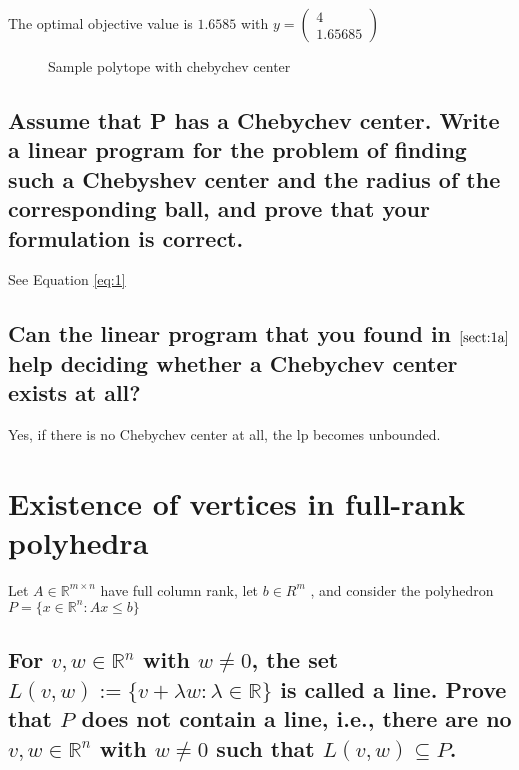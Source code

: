 \documentclass[12pt, a4]{article}
\newcommand{\lightgray}{black!30}
\newcommand{\plotDomain}{-1:10}
\newcommand{\addPlotLDownCoords}[1]{
	\addplot[mark=none, domain=\plotDomain, color=\lightgray,
	decoration={border,segment length=1mm,amplitude=1.5mm,angle=-135},
	postaction={decorate}
	] coordinates {#1};
	\addplot[mark=none, domain=\plotDomain] coordinates {#1};
}
\newcommand{\addPlotLDown}[1]{
	\addplot[mark=none, domain=\plotDomain, color=\lightgray,
	decoration={border,segment length=1mm,amplitude=1.5mm,angle=-135},
	postaction={decorate}
	] {#1};
	\addplot[mark=none, domain=\plotDomain] {#1};
}
\newcommand{\addPlotRUp}[1]{
	\addplot[mark=none, domain=\plotDomain, color=\lightgray,
	decoration={border,segment length=1mm,amplitude=1.5mm,angle=135},
	postaction={decorate}
	] {#1};
	\addplot[mark=none, domain=\plotDomain] {#1};
}
\begin{document}
The optimal objective value is $1.6585$ with $y = \begin{pmatrix}4\\1.65685\end{pmatrix}$


\begin{figure}[h]
	\centering
	\caption{Sample polytope with chebychev center}
\end{figure}

\subsection{Assume that P has a Chebychev center. Write a linear program for the problem of finding such
a Chebyshev center and the radius of the corresponding ball, and prove that your formulation is
correct. \label{sect:1a}}
See Equation \ref{eq:1}

\subsection{Can the linear program that you found in \(\ref{sect:1a}\) help deciding whether a Chebychev center exists
at all?}
Yes, if there is no Chebychev center at all, the lp becomes unbounded.

\section{Existence of vertices in full-rank polyhedra}
Let $A \in \mathbb{R}^{m \times n}$ have full column rank, let $b \in R^m$ , and consider the polyhedron ${P = \{x \in \mathbb{R}^n : Ax \leq b\}}$
\subsection{For $v, w \in \mathbb{R}^n$ with $w \neq 0$, the set $L(v, w) := \{v + \lambda w : \lambda \in \mathbb{R}\}$ is called a line. Prove that $P$ does
not contain a line, i.e., there are no $v, w \in \mathbb{R}^n$ with $w \neq 0$ such that $L(v, w) \subseteq P$.}
\end{document}
